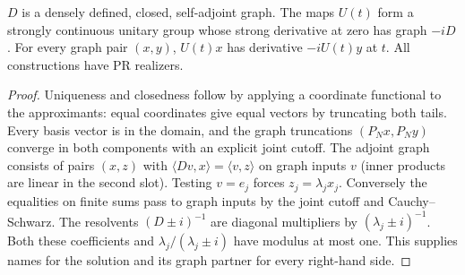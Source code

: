 \begin{theorem}\label{thm:diag-energy}
$D$ is a densely defined, closed, self-adjoint graph. The maps $U(t)$
form a strongly continuous unitary group whose strong derivative at zero
has graph $-iD$. For every graph pair $(x,y)$, $U(t)x$ has derivative
$-iU(t)y$ at $t$. All constructions have PR realizers.
\end{theorem}
\begin{proof}
Uniqueness and closedness follow by applying a coordinate functional to
the approximants: equal coordinates give equal vectors by truncating both
tails. Every basis vector is in the domain, and the graph truncations
$(P_Nx,P_Ny)$ converge in both components with an explicit joint cutoff.
The adjoint graph consists of pairs $(x,z)$ with
$\langle Dv,x\rangle=\langle v,z\rangle$ on graph inputs $v$
(inner products are linear in the second slot).
Testing $v=e_j$ forces $z_j=\lambda_jx_j$.
Conversely the equalities on finite sums pass to graph inputs by the joint
cutoff and Cauchy--Schwarz. The resolvents $(D\pm i)^{-1}$ are diagonal
multipliers by $(\lambda_j\pm i)^{-1}$. Both these coefficients and
$\lambda_j/(\lambda_j\pm i)$ have modulus at most one. This supplies
names for the solution and its graph partner for every right-hand side.


\end{proof}
